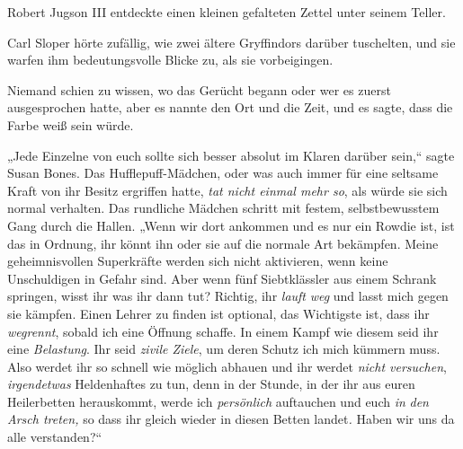 Robert Jugson III entdeckte einen kleinen gefalteten Zettel unter seinem Teller.

Carl Sloper hörte zufällig, wie zwei ältere Gryffindors darüber tuschelten, und sie warfen ihm bedeutungsvolle Blicke zu, als sie vorbeigingen.

Niemand schien zu wissen, wo das Gerücht begann oder wer es zuerst ausgesprochen hatte, aber es nannte den Ort und die Zeit, und es sagte, dass die Farbe weiß sein würde.

\later

„Jede Einzelne von euch sollte sich besser absolut im Klaren darüber sein,“ sagte Susan Bones. Das Hufflepuff-Mädchen, oder was auch immer für eine seltsame Kraft von ihr Besitz ergriffen hatte, \emph{tat nicht einmal mehr so}, als würde sie sich normal verhalten. Das rundliche Mädchen schritt mit festem, selbstbewusstem Gang durch die Hallen. „Wenn wir dort ankommen und es nur ein Rowdie ist, ist das in Ordnung, ihr könnt ihn oder sie auf die normale Art bekämpfen. Meine geheimnisvollen Superkräfte werden sich nicht aktivieren, wenn keine Unschuldigen in Gefahr sind. Aber wenn fünf Siebtklässler aus einem Schrank springen, wisst ihr was ihr dann tut? Richtig, ihr \emph{lauft} \emph{weg} und lasst mich gegen sie kämpfen. Einen Lehrer zu finden ist optional, das Wichtigste ist, dass ihr \emph{wegrennt}, sobald ich eine Öffnung schaffe. In einem Kampf wie diesem seid ihr eine \emph{Belastung}. Ihr seid \emph{zivile Ziele}, um deren Schutz ich mich kümmern muss. Also werdet ihr so schnell wie möglich abhauen und ihr werdet \emph{nicht versuchen}, \emph{irgendetwas} Heldenhaftes zu tun, denn in der Stunde, in der ihr aus euren Heilerbetten herauskommt, werde ich \emph{persönlich} auftauchen und euch \emph{in} \emph{den Arsch treten,} so dass ihr gleich wieder in diesen Betten landet\emph{.} Haben wir uns da alle verstanden?“

